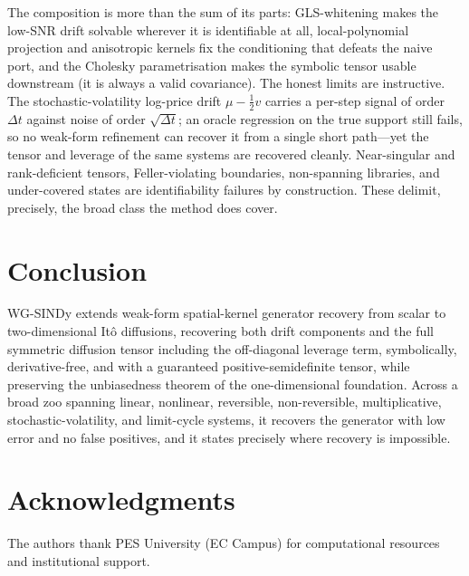 \documentclass[11pt]{article}
\begin{document}
The composition is more than the sum of its parts: GLS-whitening makes the low-SNR drift
solvable wherever it is identifiable at all, local-polynomial projection and anisotropic kernels
fix the conditioning that defeats the naive port, and the Cholesky parametrisation makes the
symbolic tensor usable downstream (it is always a valid covariance). The honest limits are
instructive. The stochastic-volatility log-price drift $\mu-\tfrac{1}{2}v$ carries a per-step
signal of order $\Delta t$ against noise of order $\sqrt{\Delta t}$; an oracle regression on
the true support still fails, so no weak-form refinement can recover it from a single short
path---yet the tensor and leverage of the same systems are recovered cleanly. Near-singular and
rank-deficient tensors, Feller-violating boundaries, non-spanning libraries, and under-covered
states are identifiability failures by construction. These delimit, precisely, the broad class
the method does cover.

\section{Conclusion}\label{sec:conclusion}

WG-SINDy extends weak-form spatial-kernel generator recovery from scalar to two-dimensional
It\^o diffusions, recovering both drift components and the full symmetric diffusion tensor
including the off-diagonal leverage term, symbolically, derivative-free, and with a guaranteed
positive-semidefinite tensor, while preserving the unbiasedness theorem of the one-dimensional
foundation. Across a broad zoo spanning linear, nonlinear, reversible, non-reversible,
multiplicative, stochastic-volatility, and limit-cycle systems, it recovers the generator with
low error and no false positives, and it states precisely where recovery is impossible.

\section*{Acknowledgments}

The authors thank PES University (EC Campus) for computational resources and institutional
support.




\appendix
\end{document}
